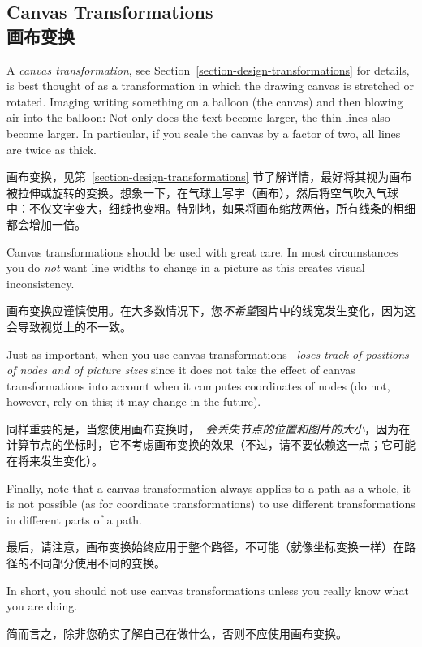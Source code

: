 \subsection{Canvas Transformations\\画布变换}

A \emph{canvas transformation}, see
Section~\ref{section-design-transformations} for details, is best thought of as
a transformation in which the drawing canvas is stretched or rotated. Imaging
writing something on a balloon (the canvas) and then blowing air into the
balloon: Not only does the text become larger, the thin lines also become
larger. In particular, if you scale the canvas by a factor of two, all lines
are twice as thick.

画布变换，见第~\ref{section-design-transformations} 节了解详情，最好将其视为画布被拉伸或旋转的变换。想象一下，在气球上写字（画布），然后将空气吹入气球中：不仅文字变大，细线也变粗。特别地，如果将画布缩放两倍，所有线条的粗细都会增加一倍。

Canvas transformations should be used with great care. In most circumstances
you do \emph{not} want line widths to change in a picture as this creates
visual inconsistency.

画布变换应谨慎使用。在大多数情况下，您\emph{不希望}图片中的线宽发生变化，因为这会导致视觉上的不一致。

Just as important, when you use canvas transformations \emph{\pgfname\ loses
track of positions of nodes and of picture sizes} since it does not take the
effect of canvas transformations into account when it computes coordinates of
nodes (do not, however, rely on this; it may change in the future).

同样重要的是，当您使用画布变换时，\emph{\pgfname\ 会丢失节点的位置和图片的大小}，因为在计算节点的坐标时，它不考虑画布变换的效果（不过，请不要依赖这一点；它可能在将来发生变化）。

Finally, note that a canvas transformation always applies to a path as a whole,
it is not possible (as for coordinate transformations) to use different
transformations in different parts of a path.

最后，请注意，画布变换始终应用于整个路径，不可能（就像坐标变换一样）在路径的不同部分使用不同的变换。

In short, you should not use canvas transformations unless you really know what
you are doing.

简而言之，除非您确实了解自己在做什么，否则不应使用画布变换。

